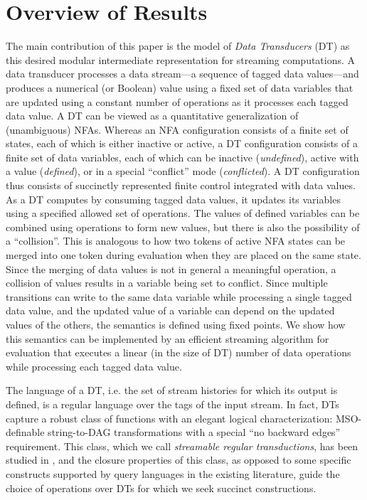 \section{Overview of Results}

The main contribution of this paper is the model of \emph{Data Transducers} (DT) as this desired
modular intermediate representation for streaming computations.
A data transducer processes a data stream---a sequence of tagged data values---and produces
a numerical (or Boolean) value using a fixed set of data variables that are updated
using a constant number of operations as it processes each tagged data value.
A DT can be viewed as a quantitative generalization of (unambiguous) NFAs.
Whereas an NFA configuration consists of a finite set of states, each of which is either inactive or active, %
a DT configuration consists of a finite set of data variables, each of which can be inactive (\emph{undefined}), active
with a value (\emph{defined}), or in a special ``conflict'' mode (\emph{conflicted}).
A DT configuration thus consists of succinctly represented finite control integrated with data values.
As a DT computes by consuming tagged data values, it updates its variables using a specified allowed
set of operations. The values of defined variables can be combined using operations to form new values,
but there is also the possibility of a ``collision''.
This is analogous to how two tokens of active NFA states can be merged into one token
during evaluation when they are placed on the same state. Since the merging of data values
is not in general a meaningful operation, a collision of values results in a variable being set
to conflict.
Since multiple transitions can write to the same data variable while processing a single tagged data value,
and the updated value of a variable can depend on the updated values of the others,
the semantics is defined using fixed points.
We show how this semantics can be implemented
by an efficient streaming algorithm for evaluation that executes a linear (in the size of DT) number
of data operations while processing each tagged data value.

The language of a DT, i.e. the set of stream histories for which its output is defined,
is a regular language over the tags of the input stream.
In fact, DTs capture a robust class of functions with an elegant logical
characterization: MSO-definable string-to-DAG %
transformations with a special ``no backward edges'' requirement. %
This class, which we call \emph{streamable regular transductions}, has been studied in
\cite{EM1999MTT,C1994MSOGT,arXiv2018}, and the closure properties of this class, as opposed to some specific constructs supported by
query languages in the existing literature, guide the choice of operations over
DTs for which we seek succinct constructions. %

